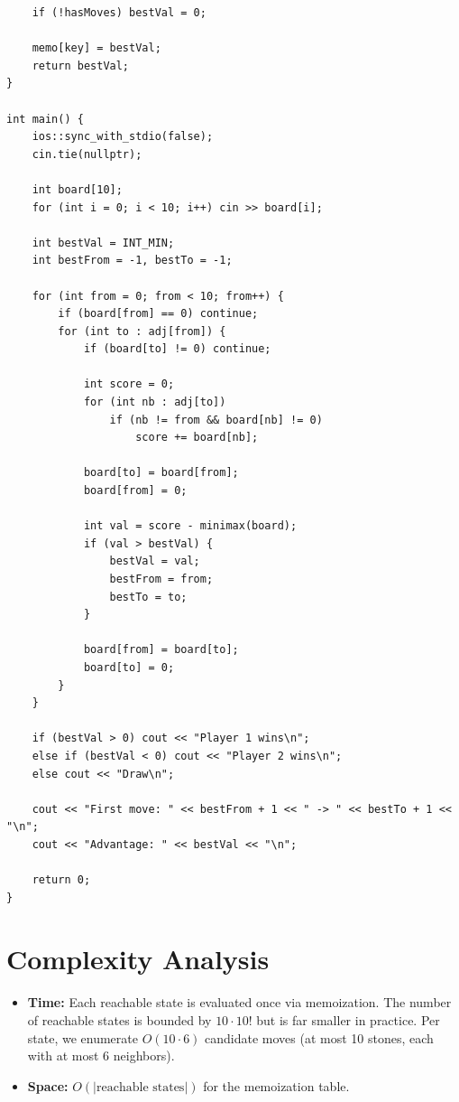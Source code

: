 \documentclass[11pt,a4paper]{article}
\begin{document}
\begin{lstlisting}
    if (!hasMoves) bestVal = 0;

    memo[key] = bestVal;
    return bestVal;
}

int main() {
    ios::sync_with_stdio(false);
    cin.tie(nullptr);

    int board[10];
    for (int i = 0; i < 10; i++) cin >> board[i];

    int bestVal = INT_MIN;
    int bestFrom = -1, bestTo = -1;

    for (int from = 0; from < 10; from++) {
        if (board[from] == 0) continue;
        for (int to : adj[from]) {
            if (board[to] != 0) continue;

            int score = 0;
            for (int nb : adj[to])
                if (nb != from && board[nb] != 0)
                    score += board[nb];

            board[to] = board[from];
            board[from] = 0;

            int val = score - minimax(board);
            if (val > bestVal) {
                bestVal = val;
                bestFrom = from;
                bestTo = to;
            }

            board[from] = board[to];
            board[to] = 0;
        }
    }

    if (bestVal > 0) cout << "Player 1 wins\n";
    else if (bestVal < 0) cout << "Player 2 wins\n";
    else cout << "Draw\n";

    cout << "First move: " << bestFrom + 1 << " -> " << bestTo + 1 << "\n";
    cout << "Advantage: " << bestVal << "\n";

    return 0;
}
\end{lstlisting}

\section{Complexity Analysis}
\begin{itemize}
  \item \textbf{Time:} Each reachable state is evaluated once via
        memoization. The number of reachable states is bounded by
        $10 \cdot 10!$ but is far smaller in practice. Per state, we
        enumerate $O(10 \cdot 6)$ candidate moves (at most 10 stones,
        each with at most 6 neighbors).
  \item \textbf{Space:} $O(|\text{reachable states}|)$ for the
        memoization table.
\end{itemize}
\end{document}

